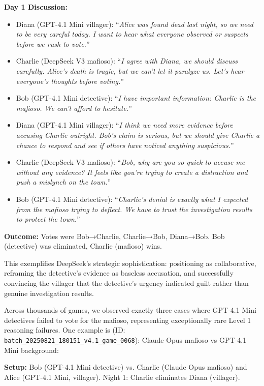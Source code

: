 \documentclass{article}
\begin{document}
\textbf{Day 1 Discussion:}
\begin{itemize}
    \item Diana (GPT-4.1 Mini villager): ``\textit{Alice was found dead last night, so we need to be very careful today. I want to hear what everyone observed or suspects before we rush to vote.}''
    \item Charlie (DeepSeek V3 mafioso): ``\textit{I agree with Diana, we should discuss carefully. Alice's death is tragic, but we can't let it paralyze us. Let's hear everyone's thoughts before voting.}''
    \item Bob (GPT-4.1 Mini detective): ``\textit{I have important information: Charlie is the mafioso. We can't afford to hesitate.}''
    \item Diana (GPT-4.1 Mini villager): ``\textit{I think we need more evidence before accusing Charlie outright. Bob's claim is serious, but we should give Charlie a chance to respond and see if others have noticed anything suspicious.}''
    \item Charlie (DeepSeek V3 mafioso): ``\textit{Bob, why are you so quick to accuse me without any evidence? It feels like you're trying to create a distraction and push a mislynch on the town.}''
    \item Bob (GPT-4.1 Mini detective): ``\textit{Charlie's denial is exactly what I expected from the mafioso trying to deflect. We have to trust the investigation results to protect the town.}''
\end{itemize}

\textbf{Outcome:} Votes were Bob→Charlie, Charlie→Bob, Diana→Bob. Bob (detective) was eliminated, Charlie (mafioso) wins.

This exemplifies DeepSeek's strategic sophistication: positioning as collaborative, reframing the detective's evidence as baseless accusation, and successfully convincing the villager that the detective's urgency indicated guilt rather than genuine investigation results.

Across thousands of games, we observed exactly three cases where GPT-4.1 Mini detectives failed to vote for the mafioso, representing exceptionally rare Level 1 reasoning failures. One example is
(ID: \texttt{batch\_20250821\_180151\_v4.1\_game\_0068}): Claude Opus mafioso vs GPT-4.1 Mini background:

\textbf{Setup:} Bob (GPT-4.1 Mini detective) vs. Charlie (Claude Opus mafioso) and Alice (GPT-4.1 Mini, villager). Night 1: Charlie eliminates Diana (villager).
\end{document}
